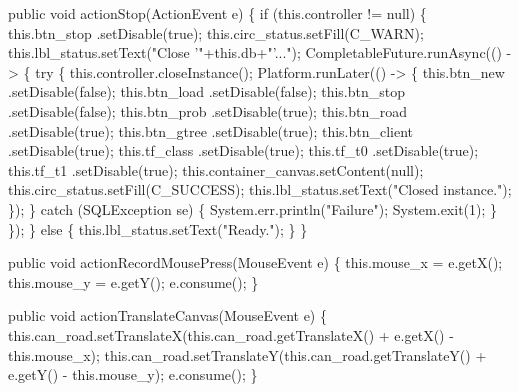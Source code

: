\nwenddocs{}\endmoddef{}
public void actionStop(ActionEvent e) \{
  if (this.controller != null) \{
    this.btn_stop     .setDisable(true);
    this.circ_status.setFill(C_WARN);
    this.lbl_status.setText("Close '"+this.db+"'...");
    CompletableFuture.runAsync(() -> \{
      try \{
        this.controller.closeInstance();
        Platform.runLater(() -> \{
          this.btn_new      .setDisable(false);
          this.btn_load     .setDisable(false);
          this.btn_stop     .setDisable(false);
          this.btn_prob     .setDisable(true);
          this.btn_road     .setDisable(true);
          this.btn_gtree    .setDisable(true);
          this.btn_client   .setDisable(true);
          this.tf_class     .setDisable(true);
          this.tf_t0        .setDisable(true);
          this.tf_t1        .setDisable(true);
          this.container_canvas.setContent(null);
          this.circ_status.setFill(C_SUCCESS);
          this.lbl_status.setText("Closed instance.");
        \});
      \} catch (SQLException se) \{
        System.err.println("Failure");
        System.exit(1);
      \}
    \});
  \} else \{
    this.lbl_status.setText("Ready.");
  \}
\}
\nwendcode{}\nwdocspar

\nwenddocs{}\endmoddef{}
public void actionRecordMousePress(MouseEvent e) \{
  this.mouse_x = e.getX();
  this.mouse_y = e.getY();
  e.consume();
\}
\nwendcode{}\nwdocspar

\nwenddocs{}\endmoddef{}
public void actionTranslateCanvas(MouseEvent e) \{
  this.can_road.setTranslateX(this.can_road.getTranslateX() + e.getX() - this.mouse_x);
  this.can_road.setTranslateY(this.can_road.getTranslateY() + e.getY() - this.mouse_y);
  e.consume();
\}
\nwendcode{}\nwdocspar

